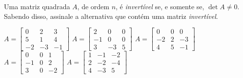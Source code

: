 Uma matriz quadrada $A$, de ordem $n$, é {\it invertível} se, e somente se, $\det A\neq 0$. Sabendo disso, assinale a alternativa que contém uma matriz {\it invertível}.

$A = \left[ \begin{array}{ccc}  0 &  2 &  3\\  5 &  1 &  4\\ -2 & -3 & -1 \end{array} \right]$
$A = \left[ \begin{array}{ccc}  2 &  0 & 0\\  -1 &  0 &  0\\  3 & -3 &  5 \end{array} \right]$
$A = \left[ \begin{array}{ccc} 0 & 0 & 0\\ -2 & 2 & -3\\ 4 &5 & -1 \end{array} \right]$
$A = \left[ \begin{array}{ccc} 0& 0 & 1\\ -1& 0 & 2\\ 3 & 0 & -2 \end{array} \right]$
$A = \left[ \begin{array}{ccc} 1 & -1 & -2\\ 2 & -2 & -4\\ 4 &-3 & 5 \end{array} \right]$













